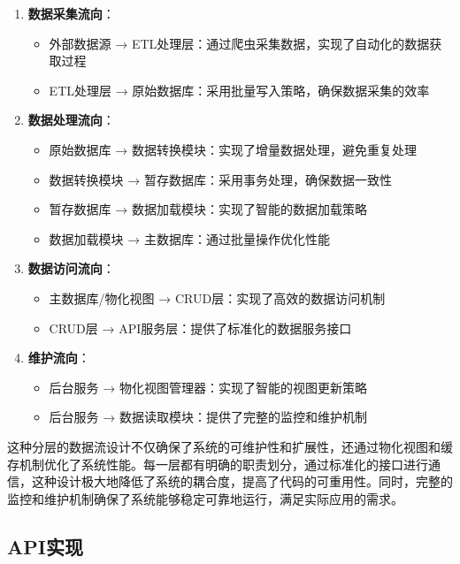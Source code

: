 \begin{enumerate}
    \item \textbf{数据采集流向}：
    \begin{itemize}
        \item 外部数据源 → ETL处理层：通过爬虫采集数据，实现了自动化的数据获取过程
        \item ETL处理层 → 原始数据库：采用批量写入策略，确保数据采集的效率
    \end{itemize}
    
    \item \textbf{数据处理流向}：
    \begin{itemize}
        \item 原始数据库 → 数据转换模块：实现了增量数据处理，避免重复处理
        \item 数据转换模块 → 暂存数据库：采用事务处理，确保数据一致性
        \item 暂存数据库 → 数据加载模块：实现了智能的数据加载策略
        \item 数据加载模块 → 主数据库：通过批量操作优化性能
    \end{itemize}
    
    \item \textbf{数据访问流向}：
    \begin{itemize}
        \item 主数据库/物化视图 → CRUD层：实现了高效的数据访问机制
        \item CRUD层 → API服务层：提供了标准化的数据服务接口
    \end{itemize}
    
    \item \textbf{维护流向}：
    \begin{itemize}
        \item 后台服务 → 物化视图管理器：实现了智能的视图更新策略
        \item 后台服务 → 数据读取模块：提供了完整的监控和维护机制
    \end{itemize}
\end{enumerate}

这种分层的数据流设计不仅确保了系统的可维护性和扩展性，还通过物化视图和缓存机制优化了系统性能。每一层都有明确的职责划分，通过标准化的接口进行通信，这种设计极大地降低了系统的耦合度，提高了代码的可重用性。同时，完整的监控和维护机制确保了系统能够稳定可靠地运行，满足实际应用的需求。

\subsection{API实现}

